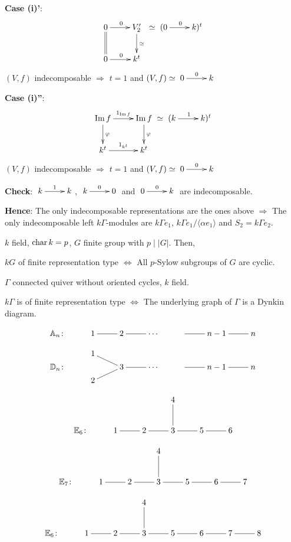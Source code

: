 \begin{exam}
\textbf{Case (i)'}:
\[\xymatrix{
0 \ar[r]^0\ar@{=}[d] & V'_2\ar[d]^\simeq\\
0 \ar[r]^0 & k^t} \simeq \xymatrix{(0\ar[r]^0 & k)^t}\]
$(V,f)$ indecomposable $\Rightarrow$ $t = 1$ and $(V,f)\simeq
\xymatrix{0\ar[r]^0 & k}$ 

\textbf{Case (i)''}: 
\[\xymatrix{
\Im f \ar[r]^{1_{\Im f}}\ar[d]^\varphi & \Im f\ar[d]^\varphi\\
k^t \ar[r]^{1_{k^t}} & k^t} \simeq \xymatrix{(k\ar[r]^1 & k)^t}\]
$(V,f)$ indecomposable $\Rightarrow$ $t = 1$ and $(V,f)\simeq
\xymatrix{0\ar[r]^0 & k}$ 

\textbf{Check}: $\xymatrix{k \ar[r]^1 & k}$, $\xymatrix{k\ar[r]^0 & 0}$ and
$\xymatrix{0 \ar[r]^0 & k}$ are indecomposable. 

\textbf{Hence}: The only indecomposable representations are the ones
above  $\Rightarrow$ The only indecomposable left $k\Gamma$-modules
are $k\Gamma e_1$, $k\Gamma e_1/\langle \alpha e_1\rangle$ and $S_2 =
k\Gamma e_2$. 
\end{exam}

\begin{thm}
$k$ field, $\operatorname{char}\nolimits k = p$, $G$ finite group with $p\mid |G|$. Then,

$kG$ of finite representation type $\Leftrightarrow$ All $p$-Sylow
subgroups of $G$ are cyclic.
\end{thm}

\begin{thm}
$\Gamma$ connected quiver without oriented cycles, $k$  field.

$k\Gamma$ is of finite representation type $\Leftrightarrow$ The
underlying graph of $\Gamma$ is a Dynkin diagram.

\[\xymatrix{\mathbb{A}_n\colon & 1\ar@{-}[r] & 2\ar@{-}[r] & \cdots &
    \ar@{-}[r] & n-1 \ar@{-}[r] & n}\]

\[\xymatrix@R=3pt{
& 1\ar@{-}[dr] &  & & & & \\
\mathbb{D}_n\colon &  & 3\ar@{-}[r] & \cdots &  \ar@{-}[r] & n-1 \ar@{-}[r] & n\\
& 2\ar@{-}[ur] & & & & & }\]

\[\xymatrix{
& & & 4\ar@{-}[d] & & \\
\mathbb{E}_6\colon & 1\ar@{-}[r] & 2\ar@{-}[r] & 3\ar@{-}[r] &
   5 \ar@{-}[r] & 6}\]

\[\xymatrix{
& & & 4\ar@{-}[d] & & & \\
\mathbb{E}_7\colon & 1\ar@{-}[r] & 2\ar@{-}[r] & 3\ar@{-}[r] &
   5 \ar@{-}[r] & 6 \ar@{-}[r] & 7}\]

\[\xymatrix{
& & & 4\ar@{-}[d] & & & &\\
\mathbb{E}_6\colon & 1\ar@{-}[r] & 2\ar@{-}[r] & 3\ar@{-}[r] &
   5 \ar@{-}[r] & 6 \ar@{-}[r] & 7 \ar@{-}[r] & 8}\]
\end{thm}
